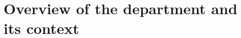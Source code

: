 %
%

\newcommand{\akcomment}[1]{
\textcolor{olive}{\textbf{AK: }\footnotesize #1}}

\newcommand{\khcomment}[1]{
\textcolor{magenta}{\textbf{KH: }\footnotesize #1}}

\newcommand{\fixlink}[1]{\textcolor{red}{Fix link!}}

\newcommand{\khaction}[1]{
\textcolor{red}{\textbf{Action: }} #1
}

\section{Overview of the department and its context}
\label{sec:overview}








